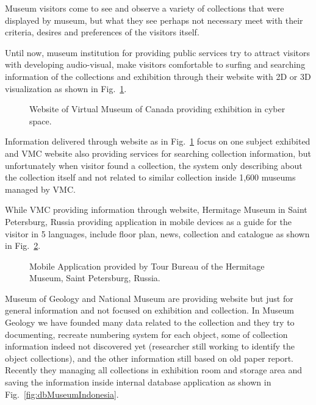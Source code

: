 Museum visitors come to see and observe a variety of collections that were displayed by museum, but what they see perhaps not necessary meet with their criteria, desires and preferences of the visitors itself.

Until now, museum institution for providing public services try to attract visitors with developing audio-visual, make visitors comfortable to surfing and searching information of the collections and exhibition through their website with 2D or 3D visualization as shown in Fig.~\cref{fig:virtualMuseumCanada}.

\begin{figure}[ht]
	\caption{Website of Virtual Museum of Canada providing exhibition in cyber space.}\label{fig:virtualMuseumCanada}
\end{figure}

Information delivered through website as in Fig.~\cref{fig:virtualMuseumCanada} focus on one subject exhibited and VMC website also providing services for searching collection information, but unfortunately when visitor found a collection, the system only describing about the collection itself and not related to similar collection inside 1,600 museums managed by VMC.

While VMC providing information through website, Hermitage Museum in Saint Petersburg, Russia providing application in mobile devices as a guide for the visitor in 5 languages, include floor plan, news, collection and catalogue as shown in Fig.~\cref{fig:hermitageApp}.

\begin{figure}[ht]
	\caption{Mobile Application provided by Tour Bureau of the Hermitage Museum, Saint Petersburg, Russia.
	}\label{fig:hermitageApp}
\end{figure}

Museum of Geology and National Museum are providing website but just for general information and not focused on exhibition and collection. In Museum Geology we have founded many data related to the collection and they try to documenting, recreate numbering system for each object, some of collection information indeed not discovered yet (researcher still working to identify the object collections), and the other information still based on old paper report. Recently they managing all collections in exhibition room and storage area and saving the information inside internal database application as shown in Fig.~\cref{fig:dbMuseumIndonesia}.

